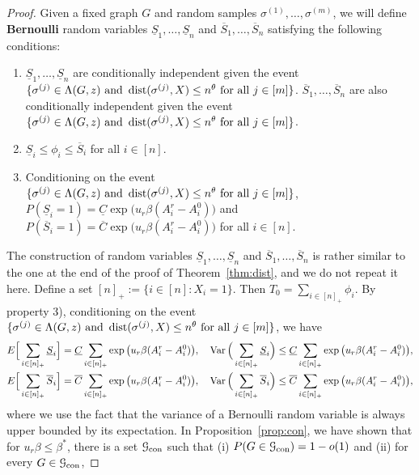 \documentclass{article}
\begin{document}
\begin{proof}
	Given a fixed graph $G$ and random samples $\sigma^{(1)},\dots,\sigma^{(m)}$, we will define {\bf Bernoulli} random variables $\underline{S}_1,\dots, \underline{S}_n$ and $\overline{S}_1,\dots,\overline{S}_n$ satisfying the following conditions:
	\begin{enumerate}
		\item $\underline{S}_1,\dots, \underline{S}_n$ are conditionally independent given the event $\{\sigma^{(j)}\in  \Lambda(G, z)
		\text{~and~} \operatorname{dist}(\sigma^{(j)}, X) \le n^\theta
		\text{~for all~} j\in[m]\}$. $\overline{S}_1,\dots,\overline{S}_n$ are also conditionally independent given the event $\{\sigma^{(j)}\in  \Lambda(G, z)
		\text{~and~} \operatorname{dist}(\sigma^{(j)}, X) \le n^\theta
		\text{~for all~} j\in[m]\}$.
		\item $\underline{S}_i\le \phi_i\le \overline{S}_i$ for all $i\in[n]$.
		\item Conditioning on the event $\{\sigma^{(j)}\in  \Lambda(G, z)
		\text{~and~} \operatorname{dist}(\sigma^{(j)}, X) \le n^\theta
		\text{~for all~} j\in[m]\}$,
		$P(\underline{S}_i=1)=\underline{C}
		\exp\big(u_r \beta (A^r_i-A^0_i) \big)$ and $P(\overline{S}_i=1)=\overline{C}
		\exp\big(u_r \beta (A^r_i-A^0_i) \big)$ for all $i\in[n]$.
	\end{enumerate}
	The construction of random variables $\underline{S}_1,\dots, \underline{S}_n$ and $\overline{S}_1,\dots,\overline{S}_n$ is rather similar to the one at the end of the proof of Theorem~\ref{thm:dist}, and we do not repeat it here. 
	Define a set $[n]_+:=\{i\in[n]:X_i=1\}$.
	Then $T_0=\sum_{i\in[n]_+} \phi_i$.
	By property 3), conditioning on the event $\{\sigma^{(j)}\in  \Lambda(G, z)
	\text{~and~} \operatorname{dist}(\sigma^{(j)}, X) \le n^\theta
	\text{~for all~} j\in[m]\}$, we have
	\begin{align*}
	& E\Big[ \sum_{i\in[n]_+}\underline{S}_i \Big] = \underline{C}
	\sum_{i\in[n]_+} \exp\big(u_r \beta (A^r_i-A^0_i) \big) , \quad
	\operatorname{Var} \Big(\sum_{i\in[n]_+}\underline{S}_i \Big) \le \underline{C}
	\sum_{i\in[n]_+} \exp\big(u_r \beta (A^r_i-A^0_i) \big), \\
	& E \Big[\sum_{i\in[n]_+} \overline{S}_i \Big] = \overline{C}
	\sum_{i\in[n]_+} \exp\big(u_r \beta (A^r_i-A^0_i) \big), \quad
	\operatorname{Var} \Big(\sum_{i\in[n]_+} \overline{S}_i \Big) \le \overline{C}
	\sum_{i\in[n]_+} \exp\big(u_r \beta (A^r_i-A^0_i) \big) ,
	\end{align*}
	where we use the fact that the variance of a Bernoulli random variable is always upper bounded by its expectation.
	In Proposition~\ref{prop:con}, we have shown that for $ u_r \beta\le \beta^\ast$, there is a set $\mathcal{G}_{\operatorname{con}}$ such that (i) $P(G \in \mathcal{G}_{\operatorname{con}}) = 1-o(1)$ and (ii) for every $G\in \mathcal{G}_{\operatorname{con}}$, 

\end{proof}
\end{document}
